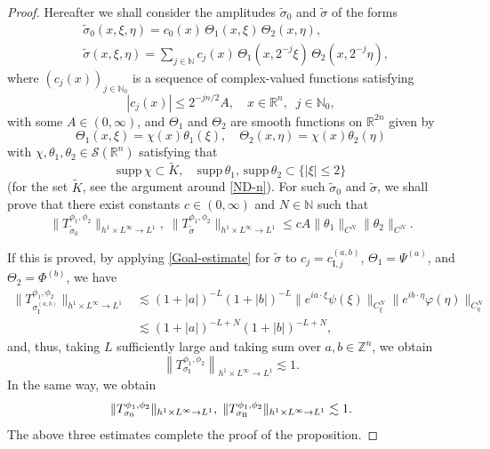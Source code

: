 \documentclass[12pt]{amsart}
\numberwithin{equation}{section}
\theoremstyle{plain}
\theoremstyle{definition}
\newcommand{\N}{\mathbb{N}}
\newcommand{\R}{\mathbb{R}}
\newcommand{\Z}{\mathbb{Z}}
\newcommand{\calS}{\mathcal{S}}
\newcommand{\supp}{\mathrm{supp}\, }
\newcommand{\RomI}{\mathrm{I}}
\newcommand{\II}{\mathrm{I}\hspace{-0.5pt}\mathrm{I}}
\begin{document}
\begin{proof}
Hereafter we shall consider 
the amplitudes $\widetilde{\sigma}_0$ and $\widetilde{\sigma}$
of the forms
\begin{align}&\label{assumption-sigma_0}
\widetilde{\sigma}_0 (x, \xi, \eta) 
=
c_{0} (x) \,
\Theta_{1} (x, \xi) \,
\Theta_{2} (x, \eta) ,
\\
&\label{assumption-sigma}
\widetilde{\sigma} (x, \xi, \eta) 
=
\sum_{j \in \N}
c_{j} (x) \,
\Theta_{1} (x, 2^{-j} \xi) \,
\Theta_{2} (x, 2^{-j} \eta), 
\end{align}
where 
$( c_j (x) )_{j\in \N_0}$ is 
a sequence of complex-valued functions satisfying 
\begin{equation}\label{assumption-cj}
\left| c_{j} (x) \right| 
\le 2^{-j n/2} A, 
\quad 
x \in \R^n,
\;\;
j\in \N_0, 
\end{equation}
with some $A\in (0, \infty)$,  
and $\Theta_{1}$ and $\Theta_{2}$ are 
smooth functions on $\R^{2n}$ given by
\begin{equation}\label{assumption-Theta}
\Theta_{1} (x, \xi) = \chi (x) \theta_1 (\xi), \quad
\Theta_{2} (x, \eta) = \chi (x) \theta_2 (\eta)
\end{equation}
with $\chi, \theta_1, \theta_2 \in \calS(\R^n)$ 
satisfying that 
\begin{equation}\label{assumption-theta}
\supp \chi \subset \widetilde{K},
\quad
\supp \theta_1 , \, \supp \theta_2 
\subset 
\{|\xi|\le 2 \} 
\end{equation}
(for the set $\widetilde{K}$,
see the argument around \eqref{ND-n}).
For such $\widetilde{\sigma}_0$ and $\widetilde{\sigma}$, 
we shall prove that
there exist constants
$c \in (0, \infty)$ and $N \in \N$
such that
\begin{equation}\label{Goal-estimate}
\| T_{ \widetilde{\sigma}_0 }^{\phi_1, \phi_2}
\|_{h^1 \times L^{\infty}\to L^1}, 
\;
\| T_{ \widetilde{\sigma} }^{\phi_1, \phi_2}
\|_{h^1 \times L^{\infty}\to L^1}
\le 
c A \|\theta_1\|_{C^N} \|\theta_2\|_{C^N} .
\end{equation}


If this is proved, by applying
\eqref{Goal-estimate} for $\widetilde{\sigma}$ to 
$c_j = c_{\RomI, j}^{(a, b)}$,  
$\Theta_{1} = \Psi^{(a)}$, and 
$\Theta_{2} = \Phi^{(b)}$,
we have 
\begin{align*}
\| T_{ {\sigma}_{\RomI}^{(a, b)} }^{\phi_1, \phi_2}
\|_{ h^1 \times L^{\infty}\to L^1 }
&\lesssim 
(1+|a|)^{-L} (1+|b|)^{-L} 
\|e^{i a \cdot \xi} \psi (\xi)\|_{C^{N}_{\xi}} 
\|e^{i b \cdot \eta} \varphi (\eta)\|_{C^{N}_{\eta}} 
\\&\lesssim (1+|a|)^{-L+N}
(1+|b|)^{-L+N}, 
\end{align*}
and, thus, taking $L$ sufficiently large and taking sum over 
$a, b \in \Z^n$, 
we obtain 
\[
\left\| 
T_{ {\sigma}_{\RomI} }^{\phi_1, \phi_2}
\right\|_{ h^1 \times L^{\infty}\to L^1 } 
\lesssim 1.
\]
In the same way, 
we obtain 
\[
\| T_{ {\sigma}_{0} }^{\phi_1, \phi_2}
\|_{ h^1 \times L^{\infty}\to L^1 } ,
\;
\| T_{ {\sigma}_{\II} }^{\phi_1, \phi_2}
\|_{ h^1 \times L^{\infty}\to L^1 } 
\lesssim 1.
\]
The above three estimates complete 
the proof of the proposition. 



\end{proof}
\end{document}
